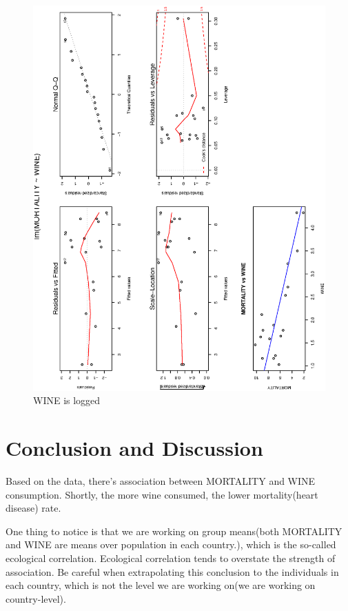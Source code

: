 \documentclass[a4paper,10pt]{article}
\begin{document}
\begin{figure}[p]
\includegraphics[angle=-90, width=1\textwidth]{figures/hw6_fig2.eps}
\caption{WINE is logged}\label{f2}
\end{figure}

\section{Conclusion and Discussion}
Based on the data, there's association between MORTALITY and WINE consumption. Shortly, the more wine consumed, the lower mortality(heart disease) rate.

One thing to notice is that we are working on group means(both MORTALITY and WINE are means over population in each country.), which is the so-called ecological correlation. Ecological correlation tends to overstate the strength of association. Be careful when extrapolating this conclusion to the individuals in each country, which is not the level we are working on(we are working on country-level).
\end{document}

